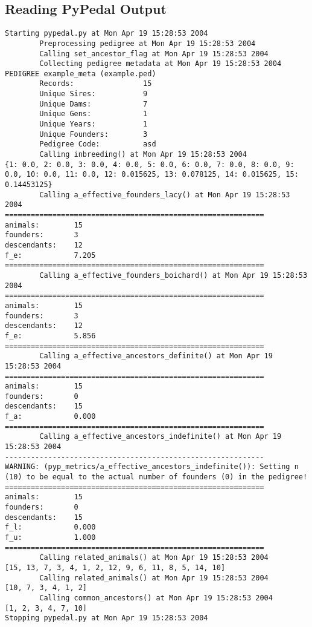 \subsection{Reading PyPedal Output}
\begin{verbatim}
Starting pypedal.py at Mon Apr 19 15:28:53 2004
        Preprocessing pedigree at Mon Apr 19 15:28:53 2004
        Calling set_ancestor_flag at Mon Apr 19 15:28:53 2004
        Collecting pedigree metadata at Mon Apr 19 15:28:53 2004
PEDIGREE example_meta (example.ped)
        Records:                15
        Unique Sires:           9
        Unique Dams:            7
        Unique Gens:            1
        Unique Years:           1
        Unique Founders:        3
        Pedigree Code:          asd
        Calling inbreeding() at Mon Apr 19 15:28:53 2004
{1: 0.0, 2: 0.0, 3: 0.0, 4: 0.0, 5: 0.0, 6: 0.0, 7: 0.0, 8: 0.0, 9: 0.0, 10: 0.0, 11: 0.0, 12: 0.015625, 13: 0.078125, 14: 0.015625, 15: 0.14453125}
        Calling a_effective_founders_lacy() at Mon Apr 19 15:28:53 2004
============================================================
animals:        15
founders:       3
descendants:    12
f_e:            7.205
============================================================
        Calling a_effective_founders_boichard() at Mon Apr 19 15:28:53 2004
============================================================
animals:        15
founders:       3
descendants:    12
f_e:            5.856
============================================================
        Calling a_effective_ancestors_definite() at Mon Apr 19 15:28:53 2004
============================================================
animals:        15
founders:       0
descendants:    15
f_a:            0.000
============================================================
        Calling a_effective_ancestors_indefinite() at Mon Apr 19 15:28:53 2004
------------------------------------------------------------
WARNING: (pyp_metrics/a_effective_ancestors_indefinite()): Setting n (10) to be equal to the actual number of founders (0) in the pedigree!
============================================================
animals:        15
founders:       0
descendants:    15
f_l:            0.000
f_u:            1.000
============================================================
        Calling related_animals() at Mon Apr 19 15:28:53 2004
[15, 13, 7, 3, 4, 1, 2, 12, 9, 6, 11, 8, 5, 14, 10]
        Calling related_animals() at Mon Apr 19 15:28:53 2004
[10, 7, 3, 4, 1, 2]
        Calling common_ancestors() at Mon Apr 19 15:28:53 2004
[1, 2, 3, 4, 7, 10]
Stopping pypedal.py at Mon Apr 19 15:28:53 2004
\end{verbatim}
